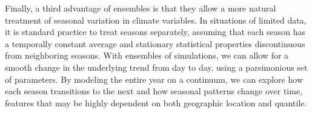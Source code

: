 \documentclass{ametsoc}
\begin{document}

Finally, a third advantage of ensembles is that they allow a more natural treatment of seasonal variation in climate variables. In situations of limited data, it is standard practice to treat seasons separately, assuming that each season has a temporally constant average and stationary statistical properties discontinuous from neighboring seasons. With ensembles of simulations, we can allow for a smooth change in the underlying trend from day to day, using a parsimonious set of parameters. By modeling the entire year on a continuum, we can explore how each season transitions to the next and how seasonal patterns change over time, features that may be highly dependent on both geographic location and quantile. 



\end{document}
